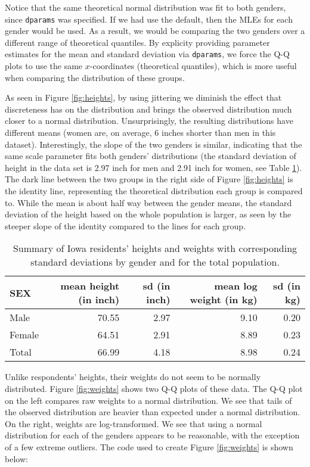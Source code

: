 Notice that the same theoretical normal distribution was fit to both
genders, since \texttt{dparams} was specified. If we had use the
default, then the MLEs for each gender would be used. As a result, we
would be comparing the two genders over a different range of theoretical
quantiles. By explicity providing parameter estimates for the mean and
standard deviation via \texttt{dparams}, we force the Q-Q plots to use
the same \(x\)-coordinates (theoretical quantiles), which is more useful
when comparing the distribution of these groups.

As seen in Figure \ref{fig:heights}, by using jittering we diminish the
effect that discreteness has on the distribution and brings the observed
distribution much closer to a normal distribution. Unsurprisingly, the
resulting distributions have different means (women are, on average, 6
inches shorter than men in this dataset). Interestingly, the slope of
the two genders is similar, indicating that the same scale parameter
fits both genders' distributions (the standard deviation of height in
the data set is 2.97 inch for men and 2.91 inch for women, see Table
\ref{tab:heights}). The dark line between the two groups in the right
side of Figure \ref{fig:heights} is the identity line, representing the
theoretical distribution each group is compared to. While the mean is
about half way between the gender means, the standard deviation of the
height based on the whole population is larger, as seen by the steeper
slope of the identity compared to the lines for each group.

\begin{table}

\caption{\label{tab:heights-table}Summary of Iowa residents' heights and weights with corresponding standard deviations by gender and for the total population.\label{tab:heights}}
\centering
\begin{tabular}[t]{lrrrr}
\toprule
SEX & mean height (in inch) & sd (in inch) & mean log weight (in kg) & sd (in kg)\\
\midrule
Male & 70.55 & 2.97 & 9.10 & 0.20\\
Female & 64.51 & 2.91 & 8.89 & 0.23\\
Total & 66.99 & 4.18 & 8.98 & 0.24\\
\bottomrule
\end{tabular}
\end{table}

Unlike respondents' heights, their weights do not seem to be normally
distributed. Figure \ref{fig:weights} shows two Q-Q plots of these data.
The Q-Q plot on the left compares raw weights to a normal distribution.
We see that tails of the observed distribution are heavier than expected
under a normal distribution. On the right, weights are log-transformed.
We see that using a normal distribution for each of the genders appears
to be reasonable, with the exception of a few extreme outliers. The code
used to create Figure \ref{fig:weights} is shown below:

